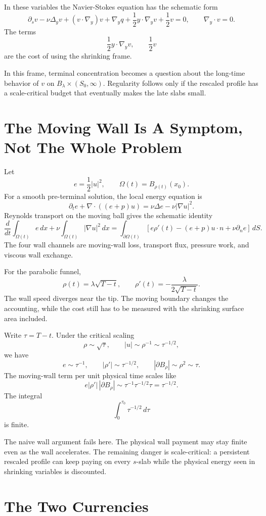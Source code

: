 \documentclass[11pt]{article}
\newcommand{\dd}{\,d}
\begin{document}
In these variables the Navier-Stokes equation has the schematic form
\[
\partial_s v-\nu\Delta_y v+(v\cdot\nabla_y)v+\nabla_y q
+\frac12 y\cdot\nabla_y v+\frac12 v=0,
\qquad
\nabla_y\cdot v=0.
\]
The terms
\[
\frac12 y\cdot\nabla_y v,
\qquad
\frac12 v
\]
are the cost of using the shrinking frame.

In this frame, terminal concentration becomes a question about the long-time behavior of \(v\) on \(B_\lambda\times(S_0,\infty)\). Regularity follows only if the rescaled profile has a scale-critical budget that eventually makes the late slabs small.

\section{The Moving Wall Is A Symptom, Not The Whole Problem}

Let
\[
e=\frac12|u|^2,
\qquad
\Omega(t)=B_{\rho(t)}(x_0).
\]
For a smooth pre-terminal solution, the local energy equation is
\[
\partial_t e+\nabla\cdot((e+p)u)=\nu\Delta e-\nu|\nabla u|^2.
\]
Reynolds transport on the moving ball gives the schematic identity
\[
\frac{d}{dt}\int_{\Omega(t)}e\dd x
+\nu\int_{\Omega(t)}|\nabla u|^2\dd x
=
\int_{\partial\Omega(t)}
\left[
 e\rho'(t)
 -(e+p)u\cdot n
 +\nu\partial_n e
\right]\dd S .
\]
The four wall channels are moving-wall loss, transport flux, pressure work, and viscous wall exchange.

For the parabolic funnel,
\[
\rho(t)=\lambda\sqrt{T-t},
\qquad
\rho'(t)=-\frac{\lambda}{2\sqrt{T-t}}.
\]
The wall speed diverges near the tip. The moving boundary changes the accounting, while the cost still has to be measured with the shrinking surface area included.

Write \(\tau=T-t\). Under the critical scaling
\[
\rho\sim\sqrt{\tau},
\qquad
|u|\sim\rho^{-1}\sim\tau^{-1/2},
\]
we have
\[
e\sim\tau^{-1},
\qquad
|\rho'|\sim\tau^{-1/2},
\qquad
|\partial B_\rho|\sim\rho^2\sim\tau.
\]
The moving-wall term per unit physical time scales like
\[
e|\rho'|\,|\partial B_\rho|
\sim
\tau^{-1}\tau^{-1/2}\tau
=
\tau^{-1/2}.
\]
The integral
\[
\int_0^{\tau_0}\tau^{-1/2}\dd\tau
\]
is finite.

The naive wall argument fails here. The physical wall payment may stay finite even as the wall accelerates. The remaining danger is scale-critical: a persistent rescaled profile can keep paying on every \(s\)-slab while the physical energy seen in shrinking variables is discounted.

\section{The Two Currencies}
\end{document}
